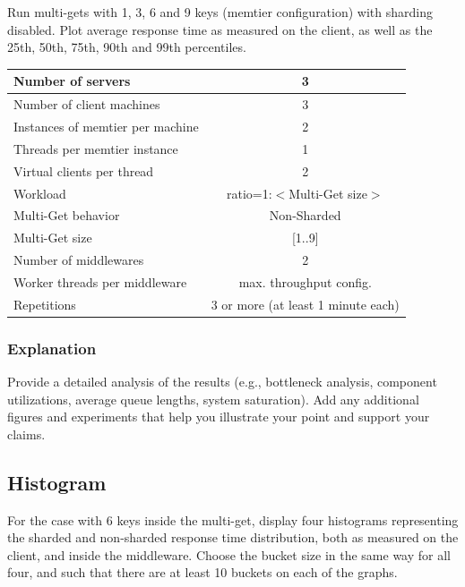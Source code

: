 \documentclass[11pt,a4paper]{article}
\begin{document}
Run multi-gets with 1, 3, 6 and 9 keys (memtier configuration) with sharding disabled. Plot average response time as measured on the client, as well as the 25th, 50th, 75th, 90th and 99th percentiles.

\begin{center}
	\scriptsize{
		\begin{tabular}{|l|c|}
			\hline Number of servers                & 3                       \\ 
			\hline Number of client machines        & 3                       \\ 
			\hline Instances of memtier per machine & 2                       \\ 
			\hline Threads per memtier instance     & 1                       \\
			\hline Virtual clients per thread       & 2                		 \\ 
			\hline Workload                         & ratio=1:$<$Multi-Get size$>$              \\
			\hline Multi-Get behavior               & Non-Sharded             \\
			\hline Multi-Get size                   & [1..9]                  \\
			\hline Number of middlewares            & 2                       \\
			\hline Worker threads per middleware    & max. throughput config. \\
			\hline Repetitions                      & 3 or more (at least 1 minute each)               \\ 
			\hline 
		\end{tabular}
	} 
\end{center}

\subsubsection{Explanation}

Provide a detailed analysis of the results (e.g., bottleneck analysis, component utilizations, average queue lengths, system saturation). Add any additional figures and experiments that help you illustrate your point and support your claims.

\subsection{Histogram}

For the case with 6 keys inside the multi-get, display four histograms representing the sharded and non-sharded response time distribution, both as measured on the client, and inside the middleware. Choose the bucket size in the same way for all four, and such that there are at least 10 buckets on each of the graphs.
\end{document}
